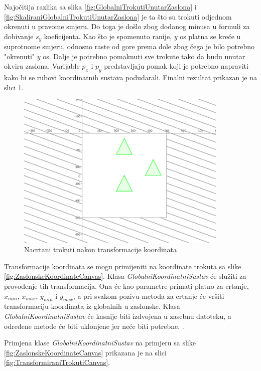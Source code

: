 \documentclass{foi}
\begin{document}
Najočitija razlika sa slika \ref{fig:GlobalniTrokutiUnutarZaslona} i \ref{fig:SkaliraniGlobalniTrokutiUnutarZaslona} je ta što su trokuti odjednom okrenuti u pravome smjeru. Do toga je došlo zbog dodanog minusa u formuli za dobivanje $s_y$ koeficijenta. Kao što je spomenuto ranije, $y$ os platna se kreće u suprotnome smjeru, odnosno raste od gore prema dole zbog čega je bilo potrebno "okrenuti" $y$ os. Dalje je potrebno pomaknuti sve trokute tako da budu unutar okvira zaslona. Varijable $p_x$ i $p_y$ predstavljaju pomak koji je potrebno napraviti kako bi se rubovi koordinatnih sustava podudarali. Finalni rezultat prikazan je na slici \ref{fig:TransformiraneGlobalneUZaslonske}. 

\begin{figure}[H]
    \centering
    \includegraphics[width=0.9\textwidth]{slike/7_TransformiraneGlobalneUZaslonske.png}
    \captionsetup{justification=centering}
    \caption{Nacrtani trokuti nakon transformacije koordinata}
\label{fig:TransformiraneGlobalneUZaslonske}
\end{figure}

Transformacije koordinata se mogu primijeniti na koordinate trokuta sa slike \ref{fig:ZaslonskeKoordinateCanvas}. Klasa \textit{GlobalniKoordinatniSustav} će služiti za provođenje tih transformacija. Ona će kao parametre primati platno za crtanje, $x_{min}$, $x_{max}$, $y_{min}$ i $y_{max}$, a pri svakom pozivu metoda za crtanje će vršiti transformaciju koordinata iz globalnih u zaslonske. Klasa \textit{GlobalniKoordinatniSustav} će kasnije biti izdvojena u zasebnu datoteku, a određene metode će biti uklonjene jer neće biti potrebne. \parencite{HipHorvatUvod}. 

Primjena klase \textit{GlobalniKoordinatniSustav} na primjeru sa slike \ref{fig:ZaslonskeKoordinateCanvas} prikazana je na slici \ref{fig:TransformiraniTrokutiCanvas}.
\end{document}

